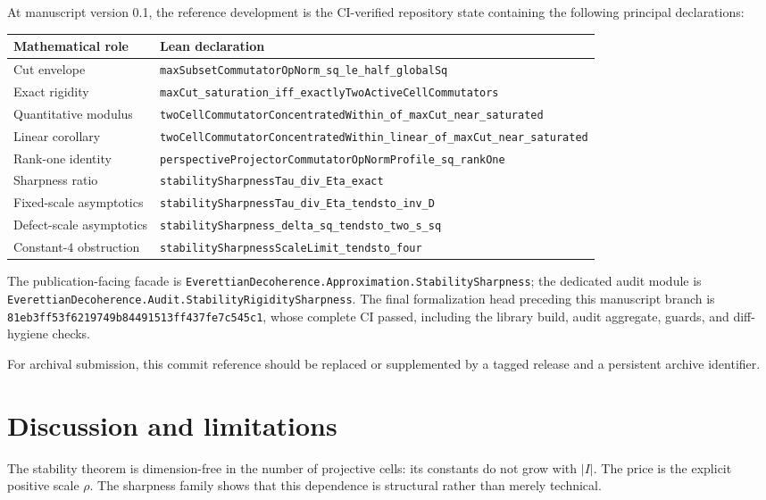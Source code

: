 \documentclass[11pt]{article}
\begin{document}
At manuscript version 0.1, the reference development is the CI-verified
repository state containing the following principal declarations:
\begin{center}
\begin{tabular}{p{}p{}}
\hline
Mathematical role & Lean declaration\\
\hline
Cut envelope &
\texttt{maxSubsetCommutatorOpNorm\_sq\_le\_half\_globalSq}\\
Exact rigidity &
\texttt{maxCut\_saturation\_iff\_exactlyTwoActiveCellCommutators}\\
Quantitative modulus &
\texttt{twoCellCommutatorConcentratedWithin\_of\_maxCut\_near\_saturated}\\
Linear corollary &
\texttt{twoCellCommutatorConcentratedWithin\_linear\_of\_maxCut\_near\_saturated}\\
Rank-one identity &
\texttt{perspectiveProjectorCommutatorOpNormProfile\_sq\_rankOne}\\
Sharpness ratio &
\texttt{stabilitySharpnessTau\_div\_Eta\_exact}\\
Fixed-scale asymptotics &
\texttt{stabilitySharpnessTau\_div\_Eta\_tendsto\_inv\_D}\\
Defect-scale asymptotics &
\texttt{stabilitySharpness\_delta\_sq\_tendsto\_two\_s\_sq}\\
Constant-$4$ obstruction &
\texttt{stabilitySharpnessScaleLimit\_tendsto\_four}\\
\hline
\end{tabular}
\end{center}

The publication-facing facade is
\texttt{EverettianDecoherence.Approximation.StabilitySharpness}; the dedicated
audit module is
\texttt{EverettianDecoherence.Audit.StabilityRigiditySharpness}.
The final formalization head preceding this manuscript branch is
\texttt{81eb3ff53f6219749b84491513ff437fe7c545c1}, whose complete CI passed,
including the library build, audit aggregate, guards, and diff-hygiene checks.

For archival submission, this commit reference should be replaced or
supplemented by a tagged release and a persistent archive identifier.

\section{Discussion and limitations}

The stability theorem is dimension-free in the number of projective cells:
its constants do not grow with $|I|$.  The price is the explicit positive
scale $\rho$.  The sharpness family shows that this dependence is structural
rather than merely technical.
\end{document}

